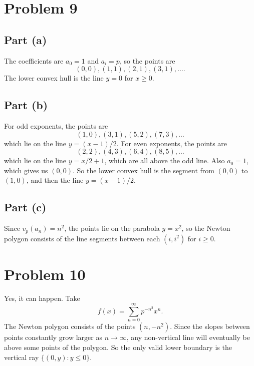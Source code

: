 \documentclass{article}
\begin{document}
\section*{Problem 9}
\subsection*{Part (a)}
The coefficients are $a_0 = 1$ and $a_i = p$, so the points are
$$(0, 0), (1, 1), (2, 1), (3, 1), \ldots.$$
The lower convex hull is the line $y = 0$ for $x \ge 0$.

\subsection*{Part (b)}
For odd exponents, the points are
$$(1, 0), (3, 1), (5, 2), (7, 3), \ldots$$
which lie on the line $y = (x - 1) / 2$. For even exponents, the points are
$$(2, 2), (4, 3), (6, 4), (8, 5), \ldots$$
which lie on the line $y = x/2 + 1$, which are all above the odd line. Also $a_0 = 1$, which gives us $(0, 0)$. So the lower convex hull is the segment from $(0, 0)$ to $(1, 0)$, and then the line $y = (x - 1) / 2$.

\subsection*{Part (c)}
Since $v_p(a_n) = n^2$, the points lie on the parabola $y = x^2$, so the Newton polygon consists of the line segments between each $(i, i^2)$ for $i \ge 0$.

\section*{Problem 10}
Yes, it can happen. Take
$$f(x) = \sum_{n = 0}^\infty p^{-n^2}x^n.$$
The Newton polygon consists of the points $(n, -n^2)$. Since the slopes between points constantly grow larger as $n \to \infty$, any non-vertical line will eventually be above some points of the polygon. So the only valid lower boundary is the vertical ray $\{(0, y) : y \le 0\}$.
\end{document}
